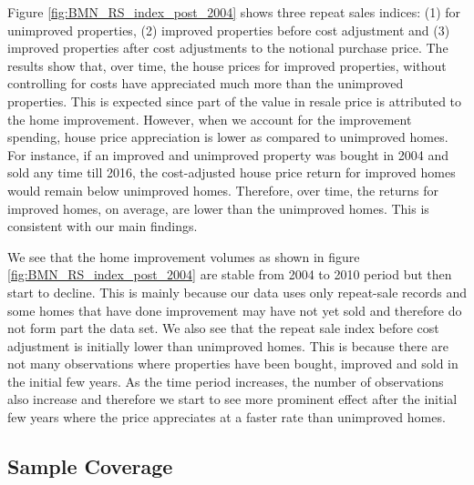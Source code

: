 \documentclass[AEJ,reqno, draftmode]{AEA} %
\begin{document}
%
Figure \ref{fig:BMN_RS_index_post_2004} shows three repeat sales indices: (1) for unimproved properties, (2) improved properties before cost adjustment and (3) improved properties after cost adjustments to the notional purchase price. The results show that, over time, the house prices for improved properties, without controlling for costs have appreciated much more than the unimproved properties. This is expected since part of the value in resale price is attributed to the home improvement. However, when we account for the improvement spending, house price appreciation is lower as compared to unimproved homes. For instance, if an improved and unimproved property was bought in 2004 and sold any time till 2016, the cost-adjusted house price return for improved homes would remain below unimproved homes. Therefore, over time, the returns for improved homes, on average, are lower than the unimproved homes. This is consistent with our main findings. 

We see that the home improvement volumes as shown in figure \ref{fig:BMN_RS_index_post_2004} are stable from 2004 to 2010 period but then start to decline. This is mainly because our data uses only repeat-sale records and some homes that have done improvement may have not yet sold and therefore do not form part the data set. We also see that the repeat sale index before cost adjustment is initially lower than unimproved homes. This is because there are not many observations where properties have been bought, improved and sold in the initial few years. As the time period increases, the number of observations also increase and therefore we start to see more prominent effect after the initial few years where the price appreciates at a faster rate than unimproved homes.




\subsection{Sample Coverage}
\end{document}

